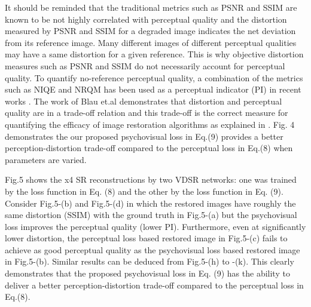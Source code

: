 \documentclass[10pt,twocolumn,letterpaper]{article}
\begin{document}
It should be reminded that the traditional metrics such as PSNR and SSIM are known to be not highly correlated with perceptual quality and the distortion measured by PSNR and SSIM for a degraded image indicates the net deviation from its reference image. Many different images of different perceptual qualities may have a same distortion for a given reference. This is why objective distortion measures such as PSNR and SSIM do not necessarily account for perceptual quality. To quantify no-reference perceptual quality, a combination of the metrics such as NIQE\cite{28} and NRQM\cite{31} has been used as a perceptual indicator (PI) in recent works \cite{29}. The work of Blau et.al \cite{5} demonstrates that distortion and perceptual quality are in a trade-off relation and this trade-off is the correct measure for quantifying the efficacy of image restoration algorithms as explained in \cite{29}. Fig. 4 demonstrates the our proposed psychovisual loss in Eq.(9) provides a better perception-distortion trade-off compared to the perceptual loss in Eq.(8) when parameters are varied.

Fig.5 shows the x4 SR reconstructions by two VDSR networks: one was trained by the loss function in Eq. (8) and the other by the loss function in Eq. (9). Consider Fig.5-(b) and Fig.5-(d) in which the restored images have roughly the same distortion (SSIM)  with the ground truth in Fig.5-(a) but the psychovisual loss improves the perceptual quality (lower PI). Furthermore, even at significantly lower distortion, the perceptual loss based restored image in Fig.5-(c) fails to achieve as good perceptual quality as the psychovisual loss based restored image in  Fig.5-(b). Similar results can be deduced from Fig.5-(h) to -(k). This clearly demonstrates that the proposed psychovisual loss in Eq. (9) has the ability to deliver a better perception-distortion trade-off compared to the perceptual loss in Eq.(8). 
\end{document}
